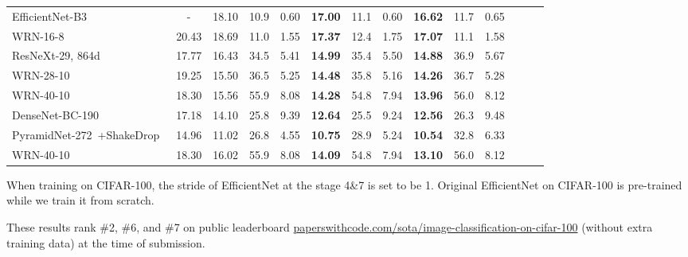 \documentclass[lettersize,journal]{IEEEtran}
\begin{document}
\begin{table*}[!t]
{\begin{threeparttable}
\begin{tabular}{l|c||ccc||ccc||cccccc}
				EfficientNet-B3~\cite{2019_EfficientNet}
				& -
				& 18.10
				& 10.9
				& 0.60		
				& \textbf{17.00}
				& 11.1
				& 0.60
				& \textbf{16.62}{\color{blue}}
				& 11.7
				& 0.65			\\
				
				
				WRN-16-8~\cite{2016_WRN}
				& 20.43
				& 18.69
				& 11.0
				& 1.55		
				& \textbf{17.37}
				& 12.4
				& 1.75
				& \textbf{17.07}{\color{blue}}
				& 11.1
				& 1.58			\\
				
				ResNeXt-29, 864d~\cite{2017_ResNeXt}
				& 17.77
				& 16.43
				& 34.5
				& 5.41
				& \textbf{14.99}
				& 35.4
				& 5.50
				& \textbf{14.88}{\color{blue}}
				& 36.9
				& 5.67
				\\				
				
				WRN-28-10~\cite{2016_WRN}
				& 19.25
				& 15.50
				& 36.5
				& 5.25		
				& \textbf{14.48}
				& 35.8
				& 5.16
				& \textbf{14.26}{\color{blue}}
				& 36.7
				& 5.28			\\				
				
				WRN-40-10~\cite{2016_WRN}
				& 18.30
				& 15.56
				& 55.9
				& 8.08		
				& \textbf{14.28}
				& 54.8
				& 7.94
				& \textbf{13.96}{\color{blue}}
				& 56.0
				& 8.12			\\
				\midrule
				
				DenseNet-BC-190~\cite{2017_densenet}
				& 17.18
				& 14.10
				& 25.8
				& 9.39		
				& \textbf{12.64}
				& 25.5
				& 9.24
				& \textbf{12.56}{\color{blue}}
				& 26.3
				& 9.48			\\
				
				PyramidNet-272~\cite{2017_PyramidNet}+ShakeDrop~\cite{2019_shakedrop}
				& 14.96
				& 11.02
				& 26.8
				& 4.55		
				& \textbf{10.75}
				& 28.9
				& 5.24
				& \textbf{10.54}{\color{blue}}
				& 32.8
				& 6.33			\\
				
				WRN-40-10~\cite{2016_WRN}
				& 18.30
				& 16.02
				& 55.9
				& 8.08		
				& \textbf{14.09}
				& 54.8
				& 7.94
				& \textbf{13.10}{\color{blue}}
				& 56.0
				& 8.12			\\
				\bottomrule	
			\end{tabular} 
			{\footnotesize \begin{tablenotes}
					\item[] When training on CIFAR-100, the stride of EfficientNet at 
					the stage 4\&7 is set to be 1. Original EfficientNet on CIFAR-100 is pre-trained while we
					train it from scratch.
					\item[] These results rank \#2, \#6, and \#7 on public leaderboard
					\href{https://paperswithcode.com/sota/image-classification-on-cifar-100}{paperswithcode.com/sota/image-classification-on-cifar-100}
					(without extra training data)
					at the time of submission.
\end{tablenotes}}
		\end{threeparttable}
	}
\end{table*} 
\end{document}
